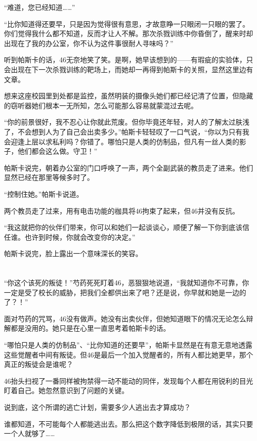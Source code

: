 “难道，您已经知道……”

“比你知道得还要早，只是因为觉得很有意思，才故意睁一只眼闭一只眼的罢了。你们觉得我什么都不知道，反而才让人不解。那次杀戮训练中你昏倒了，醒来时却出现在了我的办公室，你不认为这件事很耐人寻味吗？”

听到帕斯卡的话，46无奈地笑了笑。是啊，她早该想到的——有瑕疵的实验体，只会出现在下一次杀戮训练的靶场上，而她却一再得到帕斯卡的关照，显然这里边有文章。

想来这座校园里到处都是监控，虽然明装的摄像头她们都已经记清了位置，但隐藏的窃听器她们根本一无所知，怎么可能那么容易就蒙混过去呢。

“你的前景很好，我不忍心让你就此荒废。但你毕竟还年轻，对人的了解太过肤浅了，不会想到人为了自己会出卖多少。”帕斯卡轻轻叹了一口气说，“你以为只有我会迎逢上层以求私利吗？你错了。哪怕只是人类的仿制品，但凡有一丝人类的影子，他们都会这么做。守卫！”

帕斯卡说完，朝着办公室的门口呼唤了一声，两个全副武装的教员走了进来。他们显然已经在那里等候多时了。

“控制住她。”帕斯卡说道。

两个教员走了过来，用有电击功能的枷具将46拘束了起来，但46并没有反抗。

“我这就把你的伙伴们带来，你可以和她们一起谈谈心，顺便了解一下你到底该信任谁。也许到时候，你就会改变你的决定。”

帕斯卡说完，脸上露出一个意味深长的笑容。

\section*{}

“你这个该死的叛徒！”芍药死死盯着46，恶狠狠地说道，“我就知道你不可靠，你一定是受了校长的威胁，把我们全都供出来了吧？还是说，你早就和她是一边的了？！”

面对芍药的咒骂，46没有做声。她没有出卖伙伴，但她知道眼下的情况无论怎么辩解都是没用的。她只是在心里一直思考着帕斯卡的话。

“哪怕只是人类的仿制品”、“比你知道的还要早”，帕斯卡显然是在有意无意地透露这些觉醒者中间有叛徒。但46是最后一个加入觉醒者的，所有人都比她更早，那个真正的叛徒会是谁呢？

46抬头扫视了一番同样被拘禁得一动不能动的同伴，发现每个人都在用锐利的目光盯着自己。她忽然意识到了问题的关键。

说到底，这个所谓的逃亡计划，需要多少人逃出去才算成功？

谁都知道，不可能每个人都能逃出去。那么把这个数字降低到极限的话，其实只要一个人就够了……

